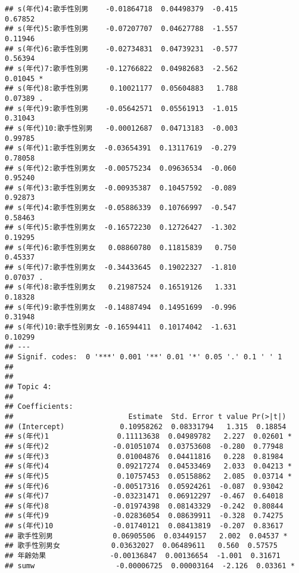 \documentclass[
]{article}
\begin{document}
\begin{verbatim}
## s(年代)4:歌手性別男    -0.01864718  0.04498379  -0.415             0.67852    
## s(年代)5:歌手性別男    -0.07207707  0.04627788  -1.557             0.11946    
## s(年代)6:歌手性別男    -0.02734831  0.04739231  -0.577             0.56394    
## s(年代)7:歌手性別男    -0.12766822  0.04982683  -2.562             0.01045 *  
## s(年代)8:歌手性別男     0.10021177  0.05604883   1.788             0.07389 .  
## s(年代)9:歌手性別男    -0.05642571  0.05561913  -1.015             0.31043    
## s(年代)10:歌手性別男   -0.00012687  0.04713183  -0.003             0.99785    
## s(年代)1:歌手性別男女  -0.03654391  0.13117619  -0.279             0.78058    
## s(年代)2:歌手性別男女  -0.00575234  0.09636534  -0.060             0.95240    
## s(年代)3:歌手性別男女  -0.00935387  0.10457592  -0.089             0.92873    
## s(年代)4:歌手性別男女  -0.05886339  0.10766997  -0.547             0.58463    
## s(年代)5:歌手性別男女  -0.16572230  0.12726427  -1.302             0.19295    
## s(年代)6:歌手性別男女   0.08860780  0.11815839   0.750             0.45337    
## s(年代)7:歌手性別男女  -0.34433645  0.19022327  -1.810             0.07037 .  
## s(年代)8:歌手性別男女   0.21987524  0.16519126   1.331             0.18328    
## s(年代)9:歌手性別男女  -0.14887494  0.14951699  -0.996             0.31948    
## s(年代)10:歌手性別男女 -0.16594411  0.10174042  -1.631             0.10299    
## ---
## Signif. codes:  0 '***' 0.001 '**' 0.01 '*' 0.05 '.' 0.1 ' ' 1
## 
## 
## Topic 4:
## 
## Coefficients:
##                           Estimate  Std. Error t value Pr(>|t|)   
## (Intercept)             0.10958262  0.08331794   1.315  0.18854   
## s(年代)1                0.11113638  0.04989782   2.227  0.02601 * 
## s(年代)2               -0.01051074  0.03753608  -0.280  0.77948   
## s(年代)3                0.01004876  0.04411816   0.228  0.81984   
## s(年代)4                0.09217274  0.04533469   2.033  0.04213 * 
## s(年代)5                0.10757453  0.05158862   2.085  0.03714 * 
## s(年代)6               -0.00517316  0.05924261  -0.087  0.93042   
## s(年代)7               -0.03231471  0.06912297  -0.467  0.64018   
## s(年代)8               -0.01974398  0.08143329  -0.242  0.80844   
## s(年代)9               -0.02836054  0.08639911  -0.328  0.74275   
## s(年代)10              -0.01740121  0.08413819  -0.207  0.83617   
## 歌手性別男              0.06905506  0.03449157   2.002  0.04537 * 
## 歌手性別男女            0.03632027  0.06489611   0.560  0.57575   
## 年齢効果               -0.00136847  0.00136654  -1.001  0.31671   
## sumw                   -0.00006725  0.00003164  -2.126  0.03361 * 

\end{verbatim}
\end{document}
